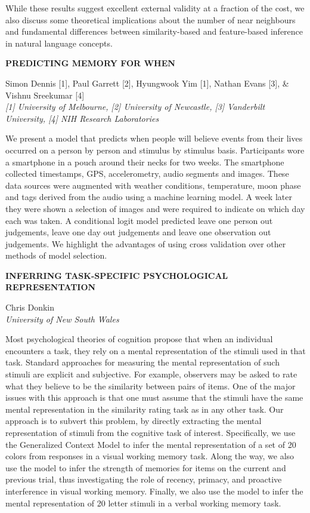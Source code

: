 \documentclass[]{article}
\begin{document}
While these results suggest excellent external validity at a fraction of
the cost, we also discuss some theoretical implications about the number
of near neighbours and fundamental differences between similarity-based
and feature-based inference in natural language concepts.\\
\pagebreak  

\textbf{PREDICTING MEMORY FOR WHEN}

Simon Dennis {[}1{]}, Paul Garrett {[}2{]}, Hyungwook Yim {[}1{]},
Nathan Evans {[}3{]}, \& Vishnu Sreekumar {[}4{]}\\
\emph{{[}1{]} University of Melbourne, {[}2{]} University of Newcastle,
{[}3{]} Vanderbilt University, {[}4{]} NIH Research Laboratories}

We present a model that predicts when people will believe events from
their lives occurred on a person by person and stimulus by stimulus
basis. Participants wore a smartphone in a pouch around their necks for
two weeks. The smartphone collected timestamps, GPS, accelerometry,
audio segments and images. These data sources were augmented with
weather conditions, temperature, moon phase and tags derived from the
audio using a machine learning model. A week later they were shown a
selection of images and were required to indicate on which day each was
taken. A conditional logit model predicted leave one person out
judgements, leave one day out judgements and leave one observation out
judgements. We highlight the advantages of using cross validation over
other methods of model selection.\\
\pagebreak  

\textbf{INFERRING TASK-SPECIFIC PSYCHOLOGICAL REPRESENTATION}

Chris Donkin\\
\emph{University of New South Wales}

Most psychological theories of cognition propose that when an individual
encounters a task, they rely on a mental representation of the stimuli
used in that task. Standard approaches for measuring the mental
representation of such stimuli are explicit and subjective. For example,
observers may be asked to rate what they believe to be the similarity
between pairs of items. One of the major issues with this approach is
that one must assume that the stimuli have the same mental
representation in the similarity rating task as in any other task. Our
approach is to subvert this problem, by directly extracting the mental
representation of stimuli from the cognitive task of interest.
Specifically, we use the Generalized Context Model to infer the mental
representation of a set of 20 colors from responses in a visual working
memory task. Along the way, we also use the model to infer the strength
of memories for items on the current and previous trial, thus
investigating the role of recency, primacy, and proactive interference
in visual working memory. Finally, we also use the model to infer the
mental representation of 20 letter stimuli in a verbal working memory
task.\\
\pagebreak  
\end{document}
